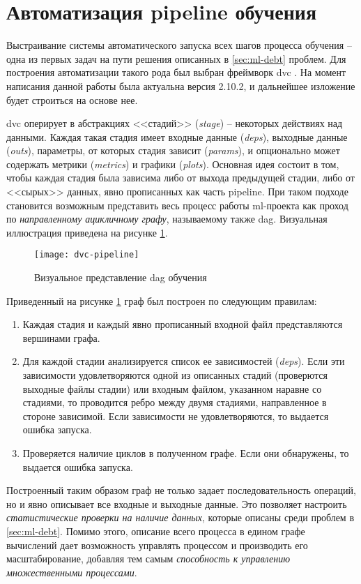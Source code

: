 \section{Автоматизация \gls{pipeline} обучения}
Выстраивание системы автоматического запуска всех шагов процесса обучения -- одна из первых задач на пути решения описанных в \ref{sec:ml-debt} проблем.
Для построения автоматизации такого рода был выбран фреймворк \gls{dvc} \cite{cite:dvc}.
На момент написания данной работы была актуальна версия 2.10.2, и дальнейшее изложение будет строиться на основе нее.

\Gls{dvc} оперирует в абстракциях <<стадий>> (\textit{stage}) -- некоторых действиях над данными.
Каждая такая стадия имеет входные данные (\textit{deps}), выходные данные (\textit{outs}), параметры, от которых стадия зависит (\textit{params}), и опционально может содержать метрики (\textit{metrics}) и графики (\textit{plots}).
Основная идея состоит в том, чтобы каждая стадия была зависима либо от выхода предыдущей стадии, либо от <<сырых>> данных, явно прописанных как часть \gls{pipeline}.
При таком подходе становится возможным представить весь процесс работы \acrshort{ml}-проекта как проход по \textit{направленному ацикличному графу}, называемому также \acrfull{dag}.
Визуальная иллюстрация приведена на рисунке \ref{fig:dvc-pipeline}.

\begin{figure}[!h]
    \centering
    \texttt{[image: dvc-pipeline]}
    \caption{Визуальное представление \acrshort{dag} обучения}
    \label{fig:dvc-pipeline}
\end{figure}

Приведенный на рисунке \ref{fig:dvc-pipeline} граф был построен по следующим правилам:
\begin{enumerate}
    \item Каждая стадия и каждый явно прописанный входной файл представляются вершинами графа.
    \item Для каждой стадии анализируется список ее зависимостей (\textit{deps}).
        Если эти зависимости удовлетворяются одной из описанных стадий (проверются выходные файлы стадии) или входным файлом, указанном наравне со стадиями, то проводится ребро между двумя стадиями, направленное в стороне зависимой.
        Если зависимости не удовлетворяются, то выдается ошибка запуска.
    \item Проверяется наличие циклов в полученном графе.
        Если они обнаружены, то выдается ошибка запуска.
\end{enumerate}
Построенный таким образом граф не только задает последовательность операций, но и явно описывает все входные и выходные данные.
Это позволяет настроить \textit{статистические проверки на наличие данных}, которые описаны среди проблем в \ref{sec:ml-debt}.
Помимо этого, описание всего процесса в едином графе вычислений дает возможность управлять процессом и производить его масштабирование, добавляя тем самым \textit{способность к управлению множественными процессами}.

